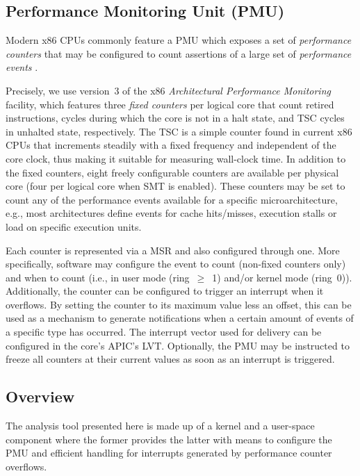 \subsection{Performance Monitoring Unit (PMU)}
\label{sec:analysis:design:pmu}
Modern \gls{x86} \glspl{CPU} commonly feature a \gls{PMU} which exposes a set of \textit{performance counters} that may be configured to count assertions of a large set of \textit{performance events} \cite{intelsdmsysprogguide}.

Precisely, we use version~3 of the \gls{x86} \textit{Architectural Performance Monitoring} facility, which features three \textit{fixed counters} per logical core that count retired instructions, cycles during which the core is not in a halt state, and \gls{TSC} cycles in unhalted state, respectively. The \gls{TSC} is a simple counter found in current \gls{x86} \glspl{CPU} that increments steadily with a fixed frequency and independent of the core clock, thus making it suitable for measuring wall-clock time. In addition to the fixed counters, eight freely configurable counters are available per physical core (four per logical core when \gls{SMT} is enabled). These counters may be set to count any of the performance events available for a specific microarchitecture, e.g., most architectures define events for cache hits/misses, execution stalls or load on specific execution units.

Each counter is represented via a \gls{MSR} and also configured through one. More specifically, software may configure the event to count (non-fixed counters only) and when to count (i.e., in user mode (ring~$\geq$~1) and/or kernel mode (ring~0)). Additionally, the counter can be configured to trigger an interrupt when it overflows. By setting the counter to its maximum value less an offset, this can be used as a mechanism to generate notifications when a certain amount of events of a specific type has occurred. The interrupt vector used for delivery can be configured in the core's \gls{APIC}'s \gls{LVT}. Optionally, the \gls{PMU} may be instructed to freeze all counters at their current values as soon as an interrupt is triggered.

\subsection{Overview}
\label{sec:analysis:design:overview}

The analysis tool presented here is made up of a kernel and a user-space component where the former provides the latter with means to configure the \gls{PMU} and efficient handling for interrupts generated by performance counter overflows.

